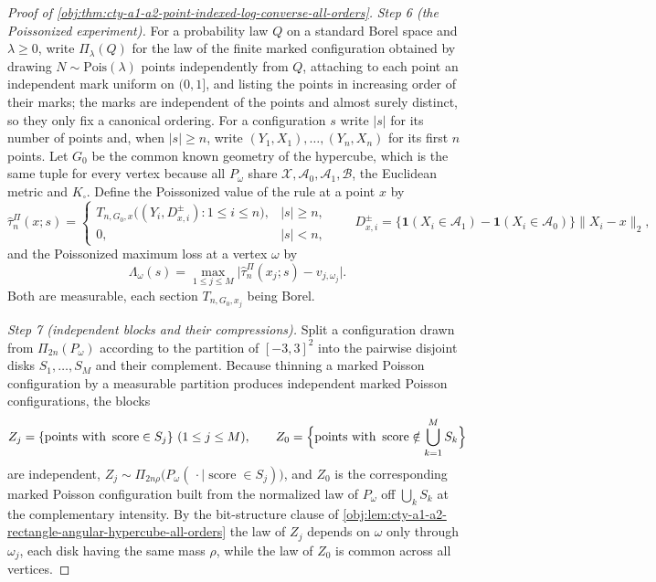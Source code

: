 \begin{proof}[Proof of \cref{obj:thm:cty-a1-a2-point-indexed-log-converse-all-orders}]
\emph{Step 6 (the Poissonized experiment).}
For a probability law \(Q\) on a standard Borel space and \(\lambda\geq0\), write
\(\Pi_\lambda(Q)\) for the law of the finite marked configuration obtained by
drawing \(N\sim\mathrm{Pois}(\lambda)\) points independently from \(Q\),
attaching to each point an independent mark uniform on \((0,1]\), and listing
the points in increasing order of their marks; the marks are independent of the
points and almost surely distinct, so they only fix a canonical ordering.  For
a configuration \(s\) write \(|s|\) for its number of points and, when
\(|s|\geq n\), write \((Y_1,X_1),\ldots,(Y_n,X_n)\) for its first \(n\) points.
Let \(G_0\) be the common known geometry of the hypercube, which is the same
tuple for every vertex because all \(P_\omega\) share
\(\mathcal X,\mathcal A_0,\mathcal A_1,\mathcal B\), the Euclidean metric and
\(K_\square\).  Define the Poissonized value of the rule at a point \(x\) by
\[
\widehat\tau^{\Pi}_n(x;s)
=
\begin{cases}
T_{n,G_0,x}\bigl((Y_i,D^{\pm}_{x,i}):1\leq i\leq n\bigr),&|s|\geq n,\\
0,&|s|<n,
\end{cases}
\qquad
D^{\pm}_{x,i}=\bigl\{\mathbf 1(X_i\in\mathcal A_1)-\mathbf 1(X_i\in\mathcal A_0)\bigr\}
\lVert X_i-x\rVert_2 ,
\]
and the Poissonized maximum loss at a vertex \(\omega\) by
\[
\Lambda_\omega(s)=\max_{1\leq j\leq M}
\bigl|\widehat\tau^{\Pi}_n(x_j;s)-v_{j,\omega_j}\bigr| .
\]
Both are measurable, each section \(T_{n,G_0,x_j}\) being Borel.

\emph{Step 7 (independent blocks and their compressions).}
Split a configuration drawn from \(\Pi_{2n}(P_\omega)\) according to the
partition of \([-3,3]^2\) into the pairwise disjoint disks \(S_1,\ldots,S_M\)
and their complement.  Because thinning a marked Poisson configuration by a
measurable partition produces independent marked Poisson configurations, the
blocks
\[
Z_j=\{\text{points with }\operatorname{score}\in S_j\}\ (1\leq j\leq M),
\qquad
Z_0=\Bigl\{\text{points with }\operatorname{score}\notin\bigcup_{k=1}^M S_k\Bigr\}
\]
are independent, \(Z_j\sim\Pi_{2n\rho}\bigl(P_\omega(\,\cdot\mid \operatorname{score}\in S_j)\bigr)\),
and \(Z_0\) is the corresponding marked Poisson configuration built from the
normalized law of \(P_\omega\) off \(\bigcup_{k}S_k\) at the complementary
intensity.  By the bit-structure clause of
\cref{obj:lem:cty-a1-a2-rectangle-angular-hypercube-all-orders} the law of
\(Z_j\) depends on \(\omega\) only through \(\omega_j\), each disk having the
same mass \(\rho\), while the law of \(Z_0\) is common across all vertices.


\end{proof}
